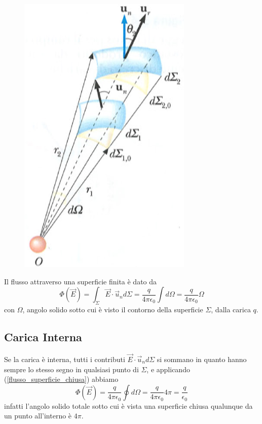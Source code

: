\documentclass[class=book, crop=false, oneside, 12pt]{standalone}
\begin{document}
\begin{figure}[h]
    \includegraphics[scale=0.5]{indipendenza_distanza.png}
    \centering
    \caption{}
\end{figure}

Il flusso attraverso una superficie finita è dato da
\begin{equation} \label{flusso_superficie_finita}
    \Phi (\overrightarrow{E}) = \int_{\Sigma} \overrightarrow{E} \cdot \overrightarrow{u}_n d \Sigma = \frac{q}{4 \pi \epsilon_0} \int d \Omega = \frac{q}{4 \pi \epsilon_0} \Omega 
\end{equation}
con \(\Omega\), angolo solido sotto cui è visto il contorno della superficie \(\Sigma\), dalla carica \(q\).

\subsection{Carica Interna}

Se la carica è interna, tutti i contributi \(\overrightarrow{E} \cdot \overrightarrow{u}_n d \Sigma\) si sommano in quanto hanno sempre lo stesso segno in qualsiasi punto di \(\Sigma\), e applicando (\ref{flusso_superficie_chiusa}) abbiamo
\begin{equation} \label{flusso_carica_interna}
    \Phi (\overrightarrow{E}) = \frac{q}{4 \pi \epsilon_0} \oint d \Omega = \frac{q}{4 \pi \epsilon_0} 4 \pi = \frac{q}{\epsilon_0}
\end{equation}
infatti l'angolo solido totale sotto cui è vista una superficie chiusa qualunque da un punto all'interno è \(4 \pi\).
\end{document}
